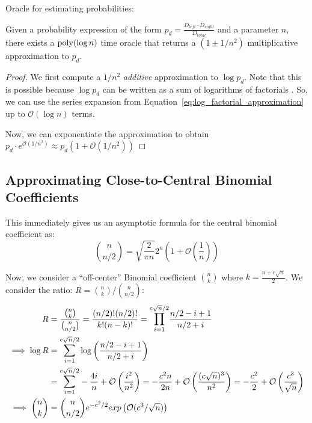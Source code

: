 Oracle for estimating probabilities:
\begin{lemma}
\label{lem:probability_approximation_oracle}

Given a probability expression of the form $p_d = \frac{D_{left}\cdot D_{right}}{D_{total}}$ and a parameter $n$,
there exists a $\mathrm{poly}(\log n)$ time oracle that returns a $\left( 1\pm 1/n^2\right)$
multiplicative approximation to $p_d$.%
\end{lemma}
\begin{proof}
We first compute a $1/n^2$ \emph{additive} approximation to $\log p_d$.
Note that this is possible because $\log p_d$ can be written as a sum of logarithms of factorials .
So, we can use the series expansion from Equation~\ref{eq:log_factorial_approximation} up to $\mathcal O(\log n)$ terms.

Now, we can exponentiate the approximation to obtain
$p_d\cdot e^{\mathcal O(1/n^2)} \approx p_d\left( 1 + \mathcal O(1/n^2)\right)$
\end{proof}


\subsection{Approximating Close-to-Central Binomial Coefficients}%
\label{sub:approximating_close_to_central_binomial_coefficients}
This immediately gives us an asymptotic formula for the central binomial coefficient as:
\[
\binom{n}{n/2} = \sqrt{\frac{2}{\pi n}}2^n\left( 1 + \mathcal O\left( \frac 1n\right)\right)
\]

Now, we consider a ``off-center'' Binomial coefficient $\binom{n}{k}$ where $k = \frac{n+c\sqrt n}{2}$.
We consider the ratio: $R = \binom{n}{k}/\binom{n}{n/2}$:
\begin{align}
R &= \frac{\binom{n}{k}}{\binom{n}{n/2}}
= \frac{(n/2)!(n/2)!}{k!(n-k)!} = \mathlarger\prod\limits_{i=1}^{c\sqrt n/2}\frac{n/2-i+1}{n/2+i}\\
\implies \log R &= \mathlarger\sum\limits_{i=1}^{c\sqrt n/2}\log\left(\frac{n/2-i+1}{n/2+i} \right)\\
&= \mathlarger\sum\limits_{i=1}^{c\sqrt n/2} - \frac{4i}{n} + \mathcal O\left( \frac{i^2}{n^2}\right)
= - \frac{c^2n}{2n} + \mathcal O\left( \frac{(c\sqrt n)^3}{n^2}\right)
= - \frac{c^2}{2} + \mathcal O\left( \frac{c^3}{\sqrt n}\right)\\
\implies \binom{n}{k} &= \binom{n}{n/2} e^{-c^2/2}exp\left( \mathcal O(c^3/\sqrt n)\right)
\end{align}




